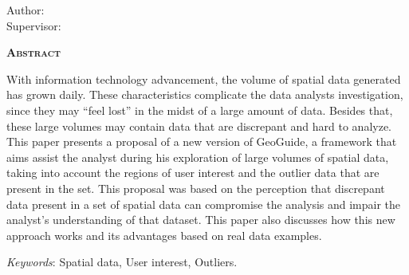 \begin{center}
	{\Large{\textbf{\thesistitle}}}
\end{center}

\vspace{1cm}

\begin{flushright}
	Author: \thesisauthor\\
	Supervisor: \thesissupervisor
\end{flushright}

\vspace{1cm}

\begin{center}
	\Large{\textsc{\textbf{Abstract}}}
\end{center}

\noindent With information technology advancement, the volume of spatial data generated has grown daily. These characteristics complicate the data  analysts investigation, since they may ``feel lost'' in the midst of a large amount of data. Besides that, these large volumes may contain data that are discrepant and hard to analyze. This paper presents a proposal of a new version of GeoGuide, a framework that aims assist the analyst during his exploration of large volumes of spatial data, taking into account the regions of user interest and the outlier data that are present in the set. This proposal was based on the perception that discrepant data present in a set of spatial data can compromise the analysis and impair the analyst's understanding of that dataset. This paper also discusses how this new approach works and its advantages based on real data examples.

\noindent\textit{Keywords}: Spatial data, User interest, Outliers.